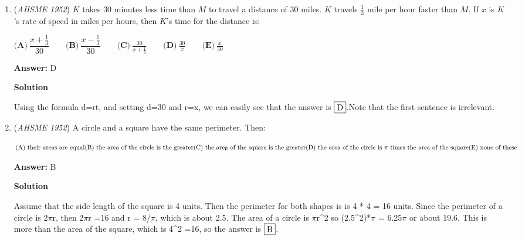\begin{enumerate}
 \textbf{Answer: }D



\textbf{Solution}

Since no three points are collinear, every two points must determine a distinct line. Thus, there are  $\dbinom{12}{2} = \frac{12\cdot11}{2} = 66$ lines. 

 Therefore, the answer is $\fbox{(D) 66}$



	\item (\textit{AHSME 1952}) $K$ takes $30$ minutes less time than $M$ to travel a distance of $30$ miles. $K$ travels $\frac {1}{3}$ mile per hour faster than $M$. If $x$ is $K$'s rate of speed in miles per hours, then $K$'s time for the distance is: 


 $\textbf{(A)}\ \dfrac{x + \frac {1}{3}}{30} \qquad \textbf{(B)}\ \dfrac{x - \frac {1}{3}}{30} \qquad \textbf{(C)}\ \frac{30}{x+\frac{1}{3}}\qquad \textbf{(D)}\ \frac{30}{x}\qquad \textbf{(E)}\ \frac{x}{30}$

 \textbf{Answer: }D



\textbf{Solution}

Using the formula d=rt, and setting d=30 and r=x, we can easily see that the answer is $\fbox{D}$.Note that the first sentence is irrelevant.

 


	\item (\textit{AHSME 1952}) A circle and a square have the same perimeter. Then: 


 $\text{(A) their areas are equal}\qquad\\ \text{(B) the area of the circle is the greater} \qquad\\ \text{(C) the area of the square is the greater} \qquad\\ \text{(D) the area of the circle is } \pi \text{ times the area of the square}\qquad\\ \text{(E) none of these}$

 \textbf{Answer: }B



\textbf{Solution}

Assume that the side length of the square is 4 units. Then the perimeter for both shapes is is 4 * 4 = 16 units. Since the perimeter of a circle is 2$\pi$r, then 2$\pi$r =16 and r = 8/$\pi$, which is about 2.5. The area of a circle is $\pi$r\textasciicircum{}2 so (2.5\textasciicircum{}2)*$\pi$ = 6.25$\pi$ or about 19.6. This is more than the area of the square, which is 4\textasciicircum{}2 =16, so the answer is $\fbox{B}$.


\end{enumerate}
